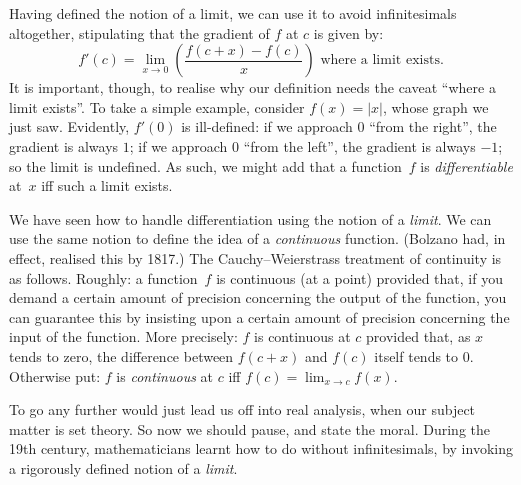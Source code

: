\documentclass[../../../include/open-logic-section]{subfiles}
\begin{document}
Having defined the notion of a limit, we can use it to avoid
infinitesimals altogether, stipulating that the gradient of $f$ at $c$
is given by:
\[
	{f}'(c) = \lim_{x \rightarrow 0}\left(\frac{f(c +x) - f(c)}{x}\right) \text{ where a limit exists}.
\]
It is important, though, to realise why our definition needs the
caveat ``where a limit exists''. To take a simple example, consider
$f(x) = |x|$, whose graph we just saw. Evidently, $f'(0)$ is
ill-defined: if we approach $0$ ``from the right'', the gradient is
always $1$; if we approach $0$ ``from the left'', the gradient is
always $-1$; so the limit is undefined. As such, we might add that a
function~$f$ is \emph{differentiable} at~$x$ iff such a limit exists.

We have seen how to handle differentiation using the notion of a
\emph{limit}. We can use the same notion to define the idea of a
\emph{continuous} function. (Bolzano had, in effect, realised this by
1817.) The Cauchy--Weierstrass treatment of continuity is as follows.
Roughly: a function~$f$ is continuous (at a point) provided that, if
you demand a certain amount of precision concerning the output of the
function, you can guarantee this by insisting upon a certain amount of
precision concerning the input of the function. More precisely: $f$ is
continuous at $c$ provided that, as $x$ tends to zero, the difference
between $f(c + x)$ and $f(c)$ itself tends to $0$. Otherwise put: $f$
is \emph{continuous} at $c$ iff $f(c) = \lim_{x \rightarrow c} f(x)$. 

To go any further would just lead us off into real analysis, when our
subject matter is set theory. So now we should pause, and state the
moral. During the 19th century, mathematicians learnt how to do
without infinitesimals, by invoking a rigorously defined notion of a
\emph{limit}.
\end{document}
